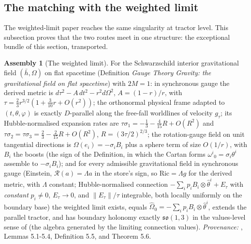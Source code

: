 \documentclass[11pt]{article}
\theoremstyle{definition}
\newtheorem{assembled}[theorem]{Assembly}
\theoremstyle{plain}
\newcommand{\changedmark}[2]{\marginpar{\raggedright\scriptsize\color{#1}#2}}
\providecommand{\hb}{}\renewcommand{\hb}{\bar{h}}
\begin{document}
\subsection*{The matching with the weighted limit}
\label{c:note.sheaf.setting-matching-weighted-limit}
The weighted-limit paper reaches the same singularity at tractor level. This subsection proves that the two routes meet in one structure: the exceptional bundle of this section, transported.

\begin{assembled}[The weighted limit]\label{c:sheaf.weighted-limit}
\changedmark{BurntOrange}{changed since the deposit}
For the Schwarzschild interior gravitational field $(\hb, \Omega)$ on flat spacetime (Definition \emph{Gauge Theory Gravity: the gravitational field on flat spacetime}) with $2M = 1$: in synchronous gauge the derived metric is $d\tau^2 - A\,dt^2 - r^2 d\Omega^2$, $A = (1-r)/r$, with $\tau = \tfrac23 r^{3/2}(1 + \tfrac{3}{10}r + O(r^2))$; the orthonormal physical frame adapted to $(t, \theta, \varphi)$ is exactly $D$-parallel along the free-fall worldlines of velocity $g_\tau$; its Hubble-normalised expansion rates are $\tau\sigma_1 = -\tfrac13 - \tfrac{4}{15}R + O(R^2)$ and $\tau\sigma_2 = \tau\sigma_3 = \tfrac23 - \tfrac{2}{15}R + O(R^2)$, $R = (3\tau/2)^{2/3}$; the rotation-gauge field on unit tangential directions is $\Omega(e_i) = -\sigma_i B_i$ plus a sphere term of size $O(1/r)$, with $B_i$ the boosts (the sign of the Definition, in which the Cartan forms $\omega^i{}_0 = \sigma_i\theta^i$ assemble to $-\sigma_i B_i$); and for every admissible gravitational field in synchronous gauge (Einstein, $\mathcal{R}(a) = \Lambda a$ in the store's sign, so $\mathrm{Ric} = \Lambda g$ for the derived metric, with $\Lambda$ constant; Hubble-normalised connection $-\sum_i p_iB_i \otimes \hat\theta^i + E_\tau$ with \emph{constant} $p_i \neq 0$, $E_\tau \to 0$, and $\|E_\tau\|/\tau$ integrable, both locally uniformly on the boundary base) the weighted limit exists, equals $\widehat\Omega_0 = -\sum_i p_i B_i \otimes \hat\theta^i$, extends the parallel tractor, and has boundary holonomy exactly $\mathfrak{so}(1,3)$ in the values-level sense of \cite[Def.~5.5]{ButlerT6} (the algebra generated by the limiting connection values). \emph{Provenance:} \cite{ButlerT6}, Lemmas 5.1-5.4, Definition 5.5, and Theorem 5.6.
\end{assembled}
\end{document}
